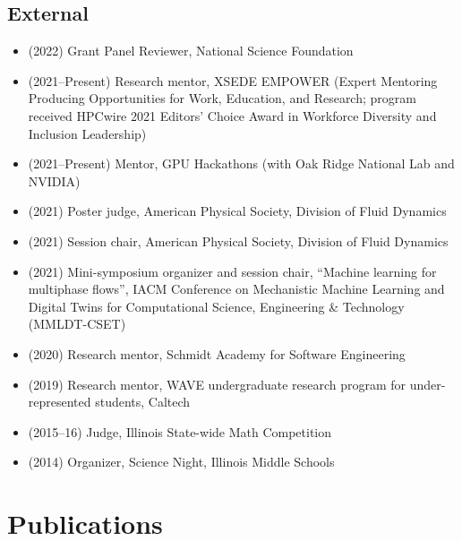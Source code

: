 \subsection{External}
\begin{itemize}
    \item (2022) Grant Panel Reviewer, National Science Foundation
    \item (2021--Present) Research mentor, XSEDE EMPOWER (Expert Mentoring Producing Opportunities for Work, Education, and Research; program received HPCwire 2021 Editors' Choice Award in Workforce Diversity and Inclusion Leadership)
    \item (2021--Present) Mentor, GPU Hackathons (with Oak Ridge National Lab and NVIDIA)
    \item (2021) Poster judge, American Physical Society, Division of Fluid Dynamics
    \item (2021) Session chair, American Physical Society, Division of Fluid Dynamics
    \item (2021) Mini-symposium organizer and session chair, ``Machine learning for multiphase flows'', IACM Conference on Mechanistic Machine Learning and Digital Twins for Computational Science, Engineering \& Technology (MMLDT-CSET)
    \item (2020) Research mentor, Schmidt Academy for Software Engineering
    \item (2019) Research mentor, WAVE undergraduate research program for under-represented students, Caltech
    \item (2015--16) Judge, Illinois State-wide Math Competition
    \item (2014) Organizer, Science Night, Illinois Middle Schools
\end{itemize}

\section{Publications}

\nocite{*}

\newrefcontext[labelprefix=P]
\printbibliography[type=unpublished,title={Preprints},resetnumbers=true,heading=subbibnumbered]

\newrefcontext[labelprefix=J]
\printbibliography[type=article,title={Journal papers},resetnumbers=true,heading=subbibnumbered]

\newrefcontext[labelprefix=C]
\printbibliography[type=inproceedings,title={Refereed conference papers},resetnumbers=true,heading=subbibnumbered]


